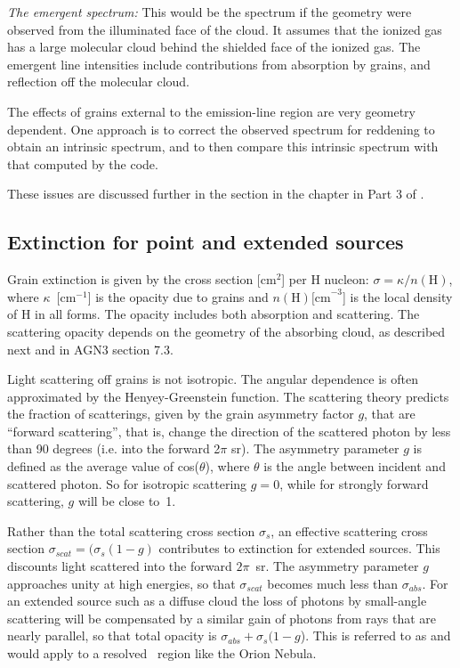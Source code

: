 \emph{The emergent spectrum:}  This would
be the spectrum if the geometry were
observed from the illuminated face of the cloud.
It assumes that the ionized
gas has a large molecular cloud behind the shielded face of the ionized
gas.  The emergent line intensities include
contributions from absorption
by grains, and reflection off the molecular cloud.

The effects of grains external to the emission-line region are very
geometry dependent.
One approach is to correct the observed spectrum for
reddening to obtain an intrinsic spectrum,
and to then compare this intrinsic
spectrum with that computed by the code.

These issues are discussed further in the
section 
in the chapter 
in Part 3 of \Hazy.

\subsection{Extinction for point and extended sources}

Grain extinction is given by the cross section [cm$^2$] per H nucleon:
$\sigma  = \kappa /n( {\mathrm{H}} )$,
where $\kappa$~[cm$^{-1}$] is the opacity due
to grains and $n(\mathrm{H}) \mathrm{[cm}^{-3}$] is the
local density of H in all forms.
The opacity includes both absorption and
scattering.
The scattering opacity depends on the geometry of the absorbing
cloud, as described next and in AGN3 section 7.3.

Light scattering off grains is not isotropic.
The angular dependence
is often approximated by the Henyey-Greenstein function.
The scattering
theory predicts the fraction of scatterings,
given by the grain asymmetry
factor $g$, that are ``forward scattering'', that is,
change the direction
of the scattered photon by less than 90 degrees
(i.e. into the forward 2$\pi$ sr).
The asymmetry parameter $g$ is defined as the average value of
cos($\theta$), where $\theta$ is the angle between incident
and scattered photon.
So for isotropic scattering $g = 0$,
while for strongly forward scattering, $g$ will be close to~1.

Rather than the total scattering cross section $\sigma_s$,
an effective scattering
cross section $\sigma_{scat} = (\sigma_s (1-g)$
contributes to extinction for extended sources.
This discounts light scattered into the forward $2\pi$~sr.
The asymmetry parameter $g$ approaches unity at high energies,
so that $\sigma_{scat}$
becomes much less than $\sigma_{abs}$.
For an extended source such as a diffuse cloud
the loss of photons by small-angle scattering will be compensated
by a
similar gain of photons from rays that are nearly parallel,
so that total
opacity is $\sigma_{abs} + \sigma_s(1-g$).
This is referred to as 
and would apply to a resolved \hii\ region like the Orion Nebula.

